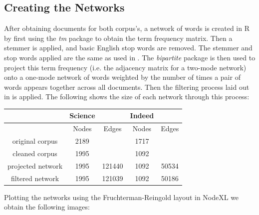 \documentclass[12pt]{article}
\begin{document}
\subsection{Creating the Networks}

After obtaining documents for both corpus's, a network of words is created in R by first using the \textit{tm} package to obtain the term frequency matrix. Then a stemmer is applied, and basic English stop words are removed. The stemmer and stop words applied are the same as used in \cite{main}. The \textit{bipartite} package is then used to project this term frequency (i.e. the adjacency matrix for a two-mode network) onto a one-mode network of words weighted by the number of times a pair of words appears together across all documents. Then the filtering process laid out in \cite{mainExtra} is applied. The following shows the size of each network through this process:
\vspace{2mm}
\begin{center}
	\begin{tabular}{ |c|c|c||c|c|  }
		\hline
		&Science& &Indeed &\\
		\hline
		&Nodes&Edges&Nodes&Edges \\
		\hline
		original corpus& 2189& &1717 & \\
		cleaned corpus& 1995& & 1092&\\
		projected network& 1995& 121440& 1092&50534\\
		filtered network& 1995&121039 & 1092&50186\\
		\hline
	\end{tabular}
\end{center}
\vspace{2mm}
Plotting the networks using the Fruchterman-Reingold layout in NodeXL we obtain the following images: 
\vspace{2mm}
\end{document}
